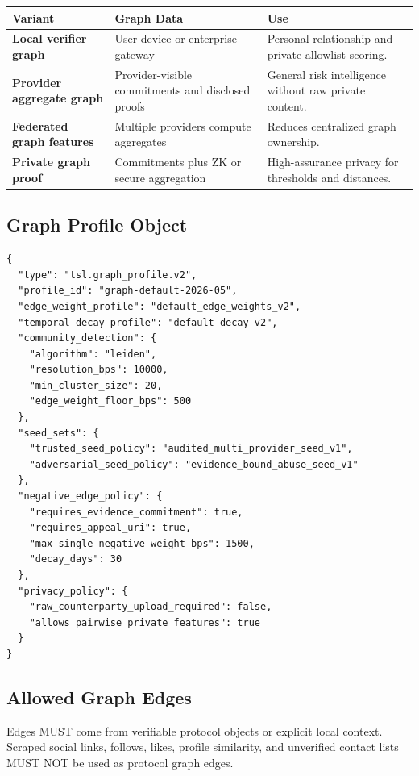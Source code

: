 \documentclass[11pt]{article}
\begin{document}
\begin{center}
\begin{tabularx}{\textwidth}{>{\bfseries}p{} p{} X}
\toprule
Variant & Graph Data & Use \\
\midrule
Local verifier graph & User device or enterprise gateway & Personal relationship and private allowlist scoring. \\
Provider aggregate graph & Provider-visible commitments and disclosed proofs & General risk intelligence without raw private content. \\
Federated graph features & Multiple providers compute aggregates & Reduces centralized graph ownership. \\
Private graph proof & Commitments plus ZK or secure aggregation & High-assurance privacy for thresholds and distances. \\
\bottomrule
\end{tabularx}
\end{center}

\subsection{Graph Profile Object}

\begin{lstlisting}[style=tslcode]
{
  "type": "tsl.graph_profile.v2",
  "profile_id": "graph-default-2026-05",
  "edge_weight_profile": "default_edge_weights_v2",
  "temporal_decay_profile": "default_decay_v2",
  "community_detection": {
    "algorithm": "leiden",
    "resolution_bps": 10000,
    "min_cluster_size": 20,
    "edge_weight_floor_bps": 500
  },
  "seed_sets": {
    "trusted_seed_policy": "audited_multi_provider_seed_v1",
    "adversarial_seed_policy": "evidence_bound_abuse_seed_v1"
  },
  "negative_edge_policy": {
    "requires_evidence_commitment": true,
    "requires_appeal_uri": true,
    "max_single_negative_weight_bps": 1500,
    "decay_days": 30
  },
  "privacy_policy": {
    "raw_counterparty_upload_required": false,
    "allows_pairwise_private_features": true
  }
}
\end{lstlisting}

\subsection{Allowed Graph Edges}

Edges MUST come from verifiable protocol objects or explicit local context. Scraped social links, follows, likes, profile similarity, and unverified contact lists MUST NOT be used as protocol graph edges.
\end{document}
